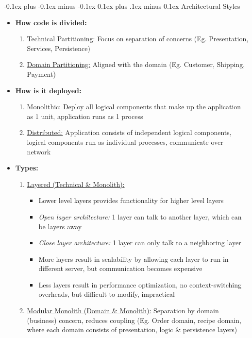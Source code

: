 \documentclass[landscape]{article}
\makeatletter
\renewcommand{\subsection}{\@startsection{subsection}{2}{0mm}%
  {-0.1ex plus -0.1ex minus -0.1ex}%
  {0.1ex plus .1ex minus 0.1ex}%
{\normalfont\scriptsize\bfseries}}
\makeatother
\begin{document}
\begin{multicols*}{5}
    \subsection{Architectural Styles}
    \begin{itemize}
      \item \textbf{How code is divided:}
      \begin{enumerate}
        \item \underline{Technical Partitioning:} Focus on separation of concerns (Eg. Presentation, Services, Persistence)
        \item \underline{Domain Partitioning:} Aligned with the domain (Eg. Customer, Shipping, Payment)
      \end{enumerate}
      \item \textbf{How is it deployed:}
      \begin{enumerate}
        \item \underline{Monolithic:} Deploy all logical components that make up the application as 1 unit, application runs as 1 process
        \item \underline{Distributed:} Application consists of independent logical components, logical components run as individual processes, communicate over network
      \end{enumerate}
      \item \textbf{Types:}
      \begin{enumerate}
        \item \underline{Layered (Technical \& Monolith):}
        \begin{itemize}
          \item Lower level layers provides functionality for higher level layers
          \item \textit{Open layer architecture:} 1 layer can talk to another layer, which can be layers away
          \item \textit{Close layer architecture:} 1 layer can only talk to a neighboring layer
          \item More layers result in scalability by allowing each layer to run in different server, but communication becomes expensive
          \item Less layers result in performance optimization, no context-switching overheads, but difficult to modify, impractical
        \end{itemize} 
        \item \underline{Modular Monolith (Domain \& Monolith):} Separation by domain (business) concern, reduces coupling (Eg. Order domain, recipe domain, where each domain consists of presentation, logic \& persistence layers)

\end{enumerate}
\end{itemize}
\end{multicols*}
\end{document}
